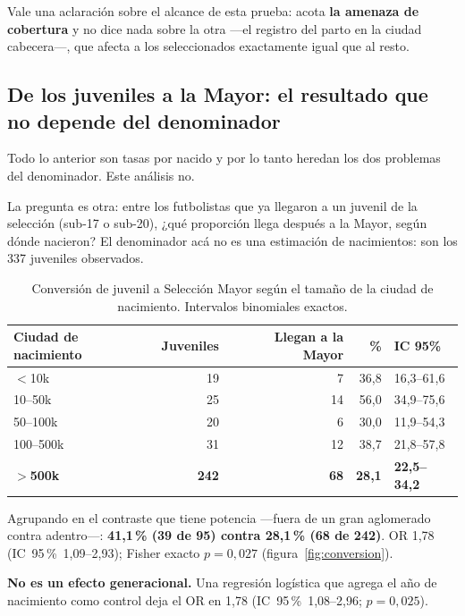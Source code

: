 \documentclass[11pt,a4paper]{article}
\newcommand{\ic}[2]{\mbox{IC 95\,\% #1--#2}}
\begin{document}
Vale una aclaración sobre el alcance de esta prueba: acota \textbf{la amenaza de
cobertura} y no dice nada sobre la otra —el registro del parto en la ciudad
cabecera—, que afecta a los seleccionados exactamente igual que al resto.

\subsection{De los juveniles a la Mayor: el resultado que no depende del denominador}
\label{sec:conversion}

Todo lo anterior son tasas por nacido y por lo tanto heredan los dos problemas
del denominador. Este análisis no.

La pregunta es otra: entre los futbolistas que ya llegaron a un juvenil de la
selección (sub-17 o sub-20), ¿qué proporción llega después a la Mayor, según
dónde nacieron? El denominador acá no es una estimación de nacimientos: son los
337 juveniles observados.

\begin{table}[!htb]\centering\small
\caption{Conversión de juvenil a Selección Mayor según el tamaño de la ciudad de
nacimiento. Intervalos binomiales exactos.}
\begin{tabular}{@{}lrrrl@{}}
\toprule
\textbf{Ciudad de nacimiento} & \textbf{Juveniles} & \textbf{Llegan a la Mayor} & \textbf{\%} & \textbf{IC 95\%}\\
\midrule
$<$10k & 19 & 7 & 36,8 & 16,3--61,6\\
10--50k & 25 & 14 & 56,0 & 34,9--75,6\\
50--100k & 20 & 6 & 30,0 & 11,9--54,3\\
100--500k & 31 & 12 & 38,7 & 21,8--57,8\\
\textbf{$>$500k} & \textbf{242} & \textbf{68} & \textbf{28,1} & \textbf{22,5--34,2}\\
\bottomrule
\end{tabular}
\end{table}

Agrupando en el contraste que tiene potencia —fuera de un gran aglomerado contra
adentro—: \textbf{41,1\,\% (39 de 95) contra 28,1\,\% (68 de 242)}. OR 1,78
(\ic{1,09}{2,93}); Fisher exacto $p = 0{,}027$ (figura~\ref{fig:conversion}).

\textbf{No es un efecto generacional.} Una regresión logística que agrega el año
de nacimiento como control deja el OR en 1,78 (\ic{1,08}{2,96}; $p = 0{,}025$).
\end{document}
